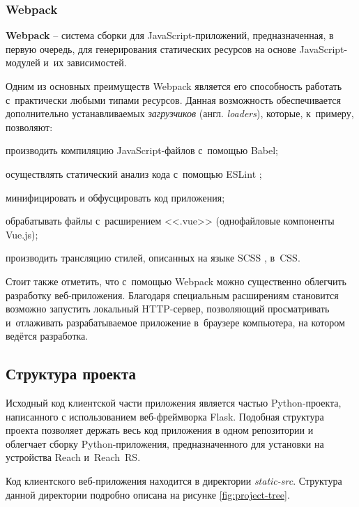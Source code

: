 \subsubsection{Webpack}

\textbf{Webpack} -- система сборки для JavaScript-приложений, предназначенная, в первую очередь, для генерирования статических ресурсов на основе JavaScript-модулей и~их зависимостей.

Одним из основных преимуществ Webpack является его способность работать с~практически любыми типами ресурсов. Данная возможность обеспечивается дополнительно устанавливаемых \emph{загрузчиков} (англ. \emph{loaders}), которые, к~примеру, позволяют:
\begin{dashitemize}
  \item производить компиляцию JavaScript-файлов с~помощью Babel;
  \item осуществлять статический анализ кода с~помощью ESLint \cite{ESLint};
  \item минифицировать и обфусцировать код приложения;
  \item обрабатывать файлы с~расширением <<.vue>> (однофайловые компоненты Vue.js);
  \item производить трансляцию стилей, описанных на языке SCSS \cite{Sass}, в~CSS.
\end{dashitemize}

Стоит также отметить, что с~помощью Webpack можно существенно облегчить разработку веб-приложения. Благодаря специальным расширениям становится возможно запустить локальный HTTP-сервер, позволяющий просматривать и~отлаживать разрабатываемое приложение в~браузере компьютера, на котором ведётся разработка.



\subsection{Структура проекта}

Исходный код клиентской части приложения является частью Python-проекта, написанного с использованием веб-фреймворка Flask. Подобная структура проекта позволяет держать весь код приложения в одном репозитории и облегчает сборку Python-приложения, предназначенного для установки на устройства Reach и~Reach~RS.

Код клиентского веб-приложения находится в директории \emph{static-src}. Структура данной директории подробно описана на рисунке \ref{fig:project-tree}.

